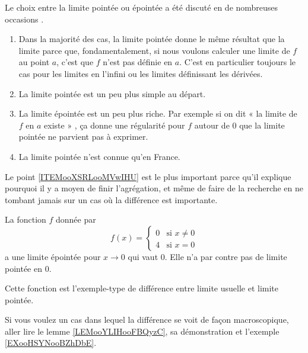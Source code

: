 Le choix entre la limite pointée ou épointée a été discuté en de nombreuses occasions \cite{BIBooKNWHooBRoxme,BIBooNUKAooVMqppa,BIBooDILKooUcmUVD,BIBooJDPPooVONaQV}.

\begin{enumerate}
    \item       \label{ITEMooXSRLooMVwIHU}
        Dans la majorité des cas, la limite pointée donne le même résultat que la limite parce que, fondamentalement, si nous voulons calculer une limite de \( f\) au point \( a\), c'est que \( f\) n'est pas définie en \( a\). C'est en particulier toujours le cas pour les limites en l'infini ou les limites définissant les dérivées.
    \item
        La limite pointée est un peu plus simple au départ.
    \item
        La limite épointée est un peu plus riche. Par exemple si on dit « la limite de \( f\) en \( a\) existe » , ça donne une régularité pour \( f\) autour de \( 0\) que la limite pointée ne parvient pas à exprimer.
    \item
        La limite pointée n'est connue qu'en France.
\end{enumerate}

Le point \ref{ITEMooXSRLooMVwIHU} est le plus important parce qu'il explique pourquoi il y a moyen de finir l'agrégation, et même de faire de la recherche en ne tombant jamais sur un cas où la différence est importante.

\begin{example}
    La fonction \( f\) donnée par
    \begin{equation}
        f(x)=\begin{cases}
            0    &   \text{si } x\neq 0\\
            4    &    \text{si }x=0
        \end{cases}
    \end{equation}
    a une limite épointée pour \( x\to 0\) qui vaut \( 0\). Elle n'a par contre pas de limite pointée en \( 0\).

    Cette fonction est l'exemple-type de différence entre limite usuelle et limite pointée.
\end{example}

\begin{example}
    Si vous voulez un cas dans lequel la différence se voit de façon macroscopique, aller lire le lemme \ref{LEMooYLIHooFBQyzC}, sa démonstration et l'exemple \ref{EXooHSYNooBZhDbE}.
\end{example}

